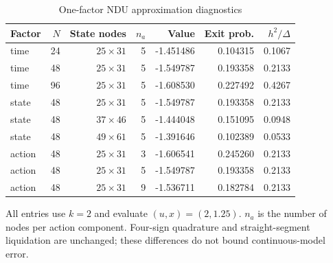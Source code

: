 \begin{table}[htbp]
\centering\small
\caption{One-factor NDU approximation diagnostics}\label{r8:tab:mesh}
\begin{tabular}{@{}lrrrrrr@{}}
\toprule
Factor & $N$ & State nodes & $n_a$ & Value & Exit prob. & $h^2/\Delta$ \\
\midrule
time & 24 & $25\times31$ & 5 & -1.451486 & 0.104315 & 0.1067 \\
time & 48 & $25\times31$ & 5 & -1.549787 & 0.193358 & 0.2133 \\
time & 96 & $25\times31$ & 5 & -1.608530 & 0.227492 & 0.4267 \\
state & 48 & $25\times31$ & 5 & -1.549787 & 0.193358 & 0.2133 \\
state & 48 & $37\times46$ & 5 & -1.444048 & 0.151095 & 0.0948 \\
state & 48 & $49\times61$ & 5 & -1.391646 & 0.102389 & 0.0533 \\
action & 48 & $25\times31$ & 3 & -1.606541 & 0.245260 & 0.2133 \\
action & 48 & $25\times31$ & 5 & -1.549787 & 0.193358 & 0.2133 \\
action & 48 & $25\times31$ & 9 & -1.536711 & 0.182784 & 0.2133 \\
\bottomrule
\end{tabular}
\par\smallskip\footnotesize All entries use $k=2$ and evaluate $(u,x)=(2,1.25)$. $n_a$ is the number of nodes per action component. Four-sign quadrature and straight-segment liquidation are unchanged; these differences do not bound continuous-model error.
\end{table}
